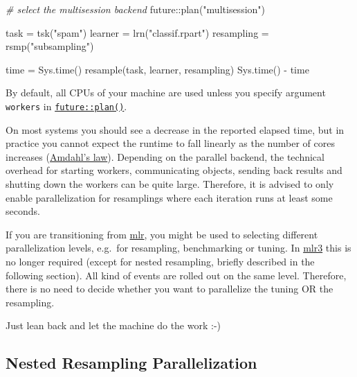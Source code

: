 \documentclass[
]{scrbook}
\newenvironment{Shaded}{\begin{snugshade}}{\end{snugshade}}
\newcommand{\CommentTok}[1]{\textcolor[rgb]{0.56,0.35,0.01}{\textit{#1}}}
\newcommand{\FunctionTok}[1]{\textcolor[rgb]{0.00,0.00,0.00}{#1}}
\newcommand{\NormalTok}[1]{#1}
\newcommand{\OtherTok}[1]{\textcolor[rgb]{0.56,0.35,0.01}{#1}}
\newcommand{\SpecialCharTok}[1]{\textcolor[rgb]{0.00,0.00,0.00}{#1}}
\newcommand{\StringTok}[1]{\textcolor[rgb]{0.31,0.60,0.02}{#1}}
\renewenvironment{Shaded} {\begin{snugshade}\small} {\end{snugshade}}
\begin{document}
\begin{Shaded}
\begin{Highlighting}[]
\CommentTok{\# select the multisession backend}
\NormalTok{future}\SpecialCharTok{::}\FunctionTok{plan}\NormalTok{(}\StringTok{"multisession"}\NormalTok{)}

\NormalTok{task }\OtherTok{=} \FunctionTok{tsk}\NormalTok{(}\StringTok{"spam"}\NormalTok{)}
\NormalTok{learner }\OtherTok{=} \FunctionTok{lrn}\NormalTok{(}\StringTok{"classif.rpart"}\NormalTok{)}
\NormalTok{resampling }\OtherTok{=} \FunctionTok{rsmp}\NormalTok{(}\StringTok{"subsampling"}\NormalTok{)}

\NormalTok{time }\OtherTok{=} \FunctionTok{Sys.time}\NormalTok{()}
\FunctionTok{resample}\NormalTok{(task, learner, resampling)}
\FunctionTok{Sys.time}\NormalTok{() }\SpecialCharTok{{-}}\NormalTok{ time}
\end{Highlighting}
\end{Shaded}

By default, all CPUs of your machine are used unless you specify argument \texttt{workers} in \href{https://www.rdocumentation.org/packages/future/topics/plan}{\texttt{future::plan()}}.

On most systems you should see a decrease in the reported elapsed time, but in practice you cannot expect the runtime to fall linearly as the number of cores increases (\href{https://www.wikiwand.com/en/Amdahl\%27s_law}{Amdahl's law}).
Depending on the parallel backend, the technical overhead for starting workers, communicating objects, sending back results and shutting down the workers can be quite large.
Therefore, it is advised to only enable parallelization for resamplings where each iteration runs at least some seconds.

If you are transitioning from \href{https://cran.r-project.org/package=mlr}{mlr}, you might be used to selecting different parallelization levels, e.g.~for resampling, benchmarking or tuning.
In \href{https://mlr3.mlr-org.com}{mlr3} this is no longer required (except for nested resampling, briefly described in the following section).
All kind of events are rolled out on the same level.
Therefore, there is no need to decide whether you want to parallelize the tuning OR the resampling.

Just lean back and let the machine do the work :-)

\hypertarget{nested-resampling-parallelization}{%
\subsection{Nested Resampling Parallelization}\label{nested-resampling-parallelization}}
\end{document}
